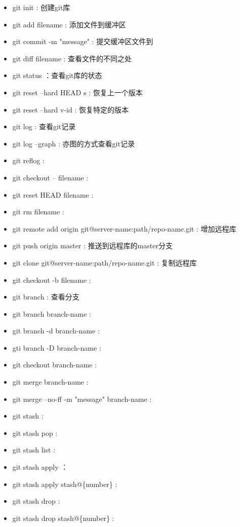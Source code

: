 \documentclass[12pt,twoside]{report}
\begin{document}
\begin{leftbar}
    \begin{itemize}
        \item git init : 创建git库
        \item git add filename : 添加文件到缓冲区
        \item git commit -m "message" : 提交缓冲区文件到
        \item git diff filename : 查看文件的不同之处
        \item git status ：查看git库的状态
        \item git reset --hard HEAD s$\hat{}$ : 恢复上一个版本
        \item git reset --hard v-id : 恢复特定的版本
        \item git log : 查看git记录
        \item git log --graph : 亦图的方式查看git记录
        \item git reflog :  
        \item git checkout -- filename :
        \item git reset HEAD filename :
        \item git rm filename :
        \item git remote add origin git@server-name:path/repo-name.git : 增加远程库
        \item git push origin master : 推送到远程库的master分支
        \item git clone git@server-name:path/repo-name.git : 复制远程库
        \item git checkout -b filename : 
        \item git branch : 查看分支
        \item git branch branch-name :
        \item git branch -d branch-name :
        \item gti branch -D branch-name :
        \item git checkout branch-name :
        \item git merge branch-name :
        \item git merge --no-ff -m "message" branch-name :
        \item git stash :
        \item git stash pop :
        \item git stash list :
        \item git stash apply ：
        \item git stash apply stash@\{number\} :
        \item git stash drop :
        \item git stash drop stash@\{number\} :
    \end{itemize}
\end{leftbar}
\end{document}
